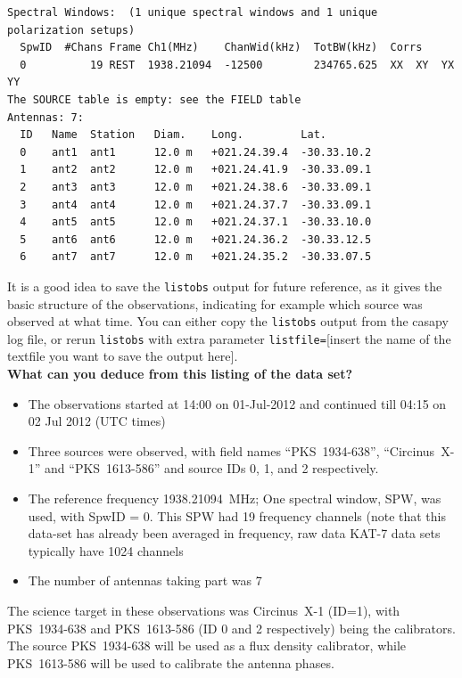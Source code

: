 \documentclass[force,almostfull,justified]{tufte-book}
\begin{document}
\begin{casaoutput}
\begin{verbatim}
Spectral Windows:  (1 unique spectral windows and 1 unique polarization setups)
  SpwID  #Chans Frame Ch1(MHz)    ChanWid(kHz)  TotBW(kHz)  Corrs          
  0          19 REST  1938.21094  -12500        234765.625  XX  XY  YX  YY  
The SOURCE table is empty: see the FIELD table
Antennas: 7:
  ID   Name  Station   Diam.    Long.         Lat.         
  0    ant1  ant1      12.0 m   +021.24.39.4  -30.33.10.2  
  1    ant2  ant2      12.0 m   +021.24.41.9  -30.33.09.1  
  2    ant3  ant3      12.0 m   +021.24.38.6  -30.33.09.1  
  3    ant4  ant4      12.0 m   +021.24.37.7  -30.33.09.1  
  4    ant5  ant5      12.0 m   +021.24.37.1  -30.33.10.0  
  5    ant6  ant6      12.0 m   +021.24.36.2  -30.33.12.5  
  6    ant7  ant7      12.0 m   +021.24.35.2  -30.33.07.5  
\end{verbatim}
\end{casaoutput}

It is a good idea to save the {\tt listobs} output for future reference, as it gives the basic
structure of the observations, indicating for example which source was observed at what time.  You can
either copy the {\tt listobs} output from the casapy log file, or rerun {\tt listobs} with extra
parameter {\tt listfile=}[insert the name of the textfile you want to save the output here]. \\

\bigskip
\noindent\textbf{What can you deduce from this listing of the data set?}

\begin{itemize}
\item  The observations started at 14:00 on 01-Jul-2012 and continued
  till 04:15 on 02 Jul 2012 (UTC times)
\item Three sources were observed, with field names ``PKS~1934-638'',
  ``Circinus~X-1'' and ``PKS~1613-586'' and source IDs 0, 1, and 2
  respectively.
\item The reference frequency 1938.21094~MHz; One spectral window,
  SPW, was used, with SpwID = 0.  This SPW had 19 frequency channels
  (note that this data-set has already been averaged in frequency, raw
  data KAT-7 data sets typically have 1024 channels
\item The number of antennas taking part was 7
\end{itemize}

The science target in these observations was Circinus~X-1 (ID=1), with PKS~1934-638 and PKS~1613-586
(ID 0 and 2 respectively) being the calibrators.  The source PKS~1934-638 will be used as a flux
density calibrator, while PKS~1613-586 will be used to calibrate the antenna phases.
\end{document}
